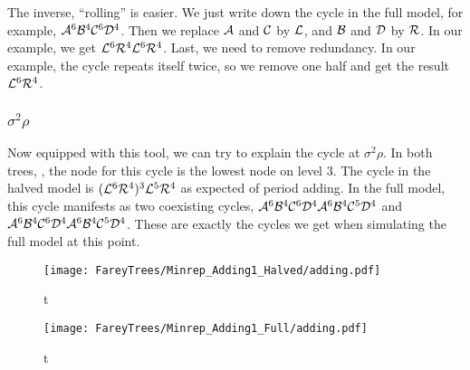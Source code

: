 The inverse, ``rolling'' is easier.
We just write down the cycle in the full model, for example, $\mathcal{A}^6\mathcal{B}^4\mathcal{C}^6\mathcal{D}^4$.
Then we replace $\mathcal{A}$ and $\mathcal{C}$ by $\mathcal{L}$, and $\mathcal{B}$ and $\mathcal{D}$ by $\mathcal{R}$.
In our example, we get $\mathcal{L}^6\mathcal{R}^4\mathcal{L}^6\mathcal{R}^4$.
Last, we need to remove redundancy.
In our example, the cycle repeats itself twice, so we remove one half and get the result $\mathcal{L}^6\mathcal{R}^4$.

\subsubsection{$\sigma^2\rho$}

Now equipped with this tool, we can try to explain the cycle at $\sigma^2\rho$.
In both trees, , the node for this cycle is the lowest node on level 3.
The cycle in the halved model is $(\mathcal{L}^6\mathcal{R}^4)^3\mathcal{L}^5\mathcal{R}^4$ as expected of period adding.
In the full model, this cycle manifests as two coexisting cycles, $\mathcal{A}^6\mathcal{B}^4\mathcal{C}^6\mathcal{D}^4\mathcal{A}^6\mathcal{B}^4\mathcal{C}^5\mathcal{D}^4$ and $\mathcal{A}^6\mathcal{B}^4\mathcal{C}^6\mathcal{D}^4\mathcal{A}^6\mathcal{B}^4\mathcal{C}^5\mathcal{D}^4$.
These are exactly the cycles we get when simulating the full model at this point.

\begin{figure}
    \centering
    \texttt{[image: FareyTrees/Minrep\_Adding1\_Halved/adding.pdf]}
    \caption{t}
    \label{fig:tree.adding1.hor.halved}
\end{figure}

\begin{figure}
    \centering
    \texttt{[image: FareyTrees/Minrep\_Adding1\_Full/adding.pdf]}
    \caption{t}
    \label{fig:tree.adding1.hor.full}
\end{figure}